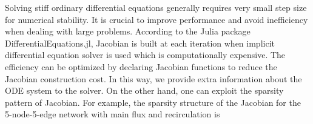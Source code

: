 
Solving stiff ordinary differential equations generally requires very small step size for numerical stability. It is crucial to improve performance and avoid inefficiency when dealing with large problems. According to the Julia package DifferentialEquations.jl, Jacobian is built at each iteration when implicit differential equation solver is used which is computationally expensive. The efficiency can be optimized by declaring Jacobian functions to reduce the Jacobian construction cost. In this way, we provide extra information about the ODE system to the solver. On the other hand, one can exploit the sparsity pattern of Jacobian. For example, the sparsity structure of the Jacobian for the 5-node-5-edge network with main flux and recirculation is
